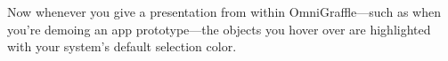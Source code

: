 \documentclass[../main.tex]{subfiles}
\begin{document}

Now whenever you give a presentation from within OmniGraffle---such as when you're demoing an
app prototype---the objects you hover over are highlighted with your system's default
selection color.
\end{document}
